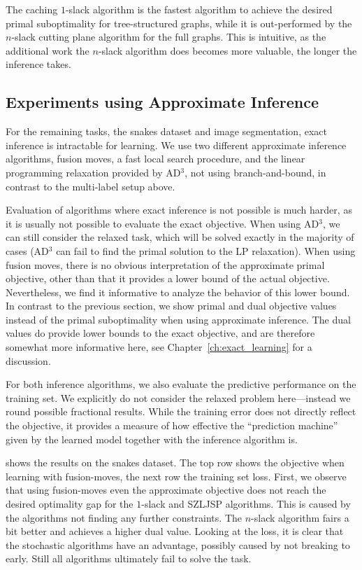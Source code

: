 The caching $1$-slack algorithm is the fastest algorithm to achieve the desired
primal suboptimality for tree-structured graphs, while it is out-performed by
the $n$-slack cutting plane algorithm for the full graphs. This is intuitive,
as the additional work the $n$-slack algorithm does becomes more valuable, the
longer the inference takes. 



\subsection{Experiments using Approximate Inference}
For the remaining tasks, the snakes dataset and image segmentation, exact
inference is intractable for learning.
%
We use two different approximate inference algorithms, fusion moves, a fast
local search procedure, and the linear programming relaxation provided by AD$^3$,
not using branch-and-bound, in contrast to the multi-label setup above.

Evaluation of algorithms where exact inference is not possible is much harder,
as it is usually not possible to evaluate the exact objective. When using AD$^3$,
we can still consider the relaxed task, which will be solved exactly in the
majority of cases (AD$^3$ can fail to find the primal solution to the LP
relaxation).
When using fusion moves, there is no obvious interpretation of the approximate
primal objective, other than that it provides a lower bound of the actual
objective. Nevertheless, we find it informative to analyze the behavior of this
lower bound. In contrast to the previous section, we show primal and dual objective
values instead of the primal suboptimality when using approximate inference.
The dual values do provide lower bounds
to the exact objective, and are therefore somewhat more informative here, see
Chapter~\ref{ch:exact_learning} for a discussion.

For both inference algorithms, we also evaluate the predictive performance on
the training set.  We explicitly do not consider the relaxed problem
here---instead we round possible fractional results. While the training error
does not directly reflect the objective, it provides a measure of how effective
the ``prediction machine'' given by the learned model together with the
inference algorithm is.

 shows the results on the snakes dataset.
The top row shows the objective when learning with fusion-moves, the next row
the training set loss.  First, we observe that using fusion-moves even the
approximate objective does not reach the desired optimality gap for the
$1$-slack and SZLJSP algorithms. This is caused by the algorithms not finding
any further constraints. The $n$-slack algorithm fairs a bit better and
achieves a higher dual value. Looking at the loss, it is clear that the stochastic
algorithms have an advantage, possibly caused by not breaking to early.
Still all algorithms ultimately fail to solve the task.

